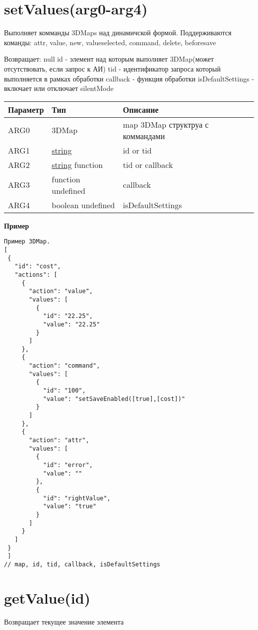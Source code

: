 \hypertarget{setvaluesarg0-arg1-arg2-arg3-arg4}{%
\section{setValues(arg0-arg4)}\label{setvaluesarg0-arg1-arg2-arg3-arg4}}

Выполняет комманды 3DMaps над динамичской формой. Поддерживаются
команды: attr, value, new, valueselected, command, delete, beforesave

Возвращает: null id - элемент над которым выполняет 3DMap(может
отсутствовать, если запрос к АИ) tid - идентификатор запроса который
выполняется в рамках обработки callback - функция обработки
isDefaultSettings - включает или отключает silentMode\\

\begin{longtable}[]{@{}lll@{}}
\toprule
Параметр & Тип & Описание\tabularnewline
\midrule
\endhead
ARG0 & 3DMap & map 3DMap структруа с коммандами\tabularnewline
ARG1 & \protect\hyperlink{string}{string} & id or tid\tabularnewline
ARG2 & \protect\hyperlink{string}{string} \textbar{} function & tid or
callback\tabularnewline
ARG3 & function \textbar{} undefined & callback\tabularnewline
ARG4 & boolean \textbar{} undefined & isDefaultSettings\tabularnewline
\bottomrule
\end{longtable}

\textbf{Пример}

\begin{verbatim}
Пример 3DMap.
[
 {
   "id": "cost",
   "actions": [
     {
       "action": "value",
       "values": [
         {
           "id": "22.25",
           "value": "22.25"
         }
       ]
     },
     {
       "action": "command",
       "values": [
         {
           "id": "100",
           "value": "setSaveEnabled([true],[cost])"
         }
       ]
     },
     {
       "action": "attr",
       "values": [
         {
           "id": "error",
           "value": ""
         },
         {
           "id": "rightValue",
           "value": "true"
         }
       ]
     }
   ]
 }
 ]
// map, id, tid, callback, isDefaultSettings
\end{verbatim}

\hypertarget{getvalueid}{%
\section{getValue(id)}\label{getvalueid}}

Возвращает текущее значение элемента

